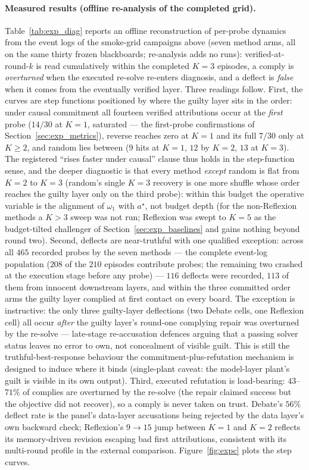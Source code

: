 \documentclass[a4paper,fleqn]{cas-sc}
\begin{document}
\paragraph{Measured results (offline re-analysis of the completed grid).}
Table~\ref{tab:exp_diag} reports an offline reconstruction of per-probe
dynamics from the event logs of the smoke-grid campaigns above (seven
method arms, all on the same thirty frozen blackboards; re-analysis adds
no runs): verified-at-round-$k$ is read cumulatively within the completed
$K{=}3$ episodes, a comply is \emph{overturned} when the executed re-solve
re-enters diagnosis, and a deflect is \emph{false} when it comes from the
eventually verified layer. Three readings follow. First, the curves are
step functions positioned by where the guilty layer sits in the order:
under causal commitment all fourteen verified attributions occur at the
\emph{first} probe ($14/30$ at $K{=}1$, saturated --- the first-probe
confirmations of Section~\ref{sec:exp_metrics}), reverse reaches zero at
$K{=}1$ and its full $7/30$ only at $K{\ge}2$, and random lies between
($9$ hits at $K{=}1$, $12$ by $K{=}2$, $13$ at $K{=}3$). The
registered ``rises faster under causal'' clause thus holds in the
step-function sense, and the deeper diagnostic is that every method
\emph{except} random is flat from $K{=}2$ to $K{=}3$ (random's single
$K{=}3$ recovery is one more shuffle whose order reaches the guilty layer
only on the third probe): within this budget the operative variable is the
alignment of $\omega_1$ with $a^{\star}$, not budget depth (for the
non-Reflexion methods a $K{>}3$ sweep was not run; Reflexion was swept to
$K{=}5$ as the budget-tilted challenger of Section~\ref{sec:exp_baselines}
and gains nothing beyond round two). Second, deflects are near-truthful with
one qualified exception: across all $465$ recorded probes by the seven
methods --- the complete event-log population ($208$ of the $210$
episodes contribute probes; the remaining two crashed at the execution
stage before any probe) --- $116$ deflects were recorded, $113$ of them
from innocent downstream layers, and within the three committed order
arms the guilty layer complied at first contact on every board. The
exception is instructive: the only three guilty-layer deflections (two
Debate cells, one Reflexion cell) all occur \emph{after} the guilty
layer's round-one complying repair was overturned by the re-solve ---
late-stage re-accusation defences arguing that a passing solver status
leaves no error to own, not concealment of visible guilt. This is still
the truthful-best-response behaviour the commitment-plus-refutation
mechanism is designed to induce where it binds (single-plant caveat: the
model-layer plant's guilt is visible in its own output). Third, executed
refutation is load-bearing: $43$--$71\%$ of complies are overturned by
the re-solve (the repair claimed success but the objective did not
recover), so a comply is never taken on trust. Debate's $56\%$ deflect
rate is the panel's data-layer accusations being rejected by the data
layer's own backward check; Reflexion's $9\to15$ jump between $K{=}1$ and
$K{=}2$ reflects its memory-driven revision escaping bad first
attributions, consistent with its multi-round profile in the external
comparison. Figure~\ref{fig:expc} plots the step curves.
\end{document}
